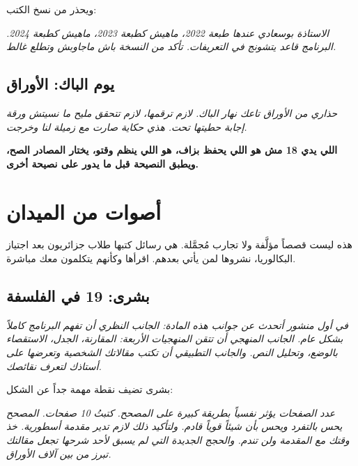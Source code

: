 \documentclass[12pt,a4paper]{book}
\newcommand{\quoteAr}[1]{%
	\begin{myquote}
		\itshape #1
	\end{myquote}
}
\newcommand{\importantAr}[1]{%
	\begin{important}
		\bfseries #1
	\end{important}
}
\begin{document}
	ويحذر من نسخ الكتب:
	
	\quoteAr{الاستاذة بوسعادي عندها طبعة 2022، ماهيش كطبعة 2023، ماهيش كطبعة 2024. البرنامج قاعد يتشونج في التعريفات. تأكد من النسخة باش ماجاوبش وتطلع غالط.}
	
	\subsection{يوم الباك: الأوراق}
	
	\quoteAr{حذاري من الأوراق تاعك نهار الباك. لازم ترقمها، لازم تتحقق مليح ما نسيتش ورقة إجابة حطيتها تحت. هذي حكاية صارت مع زميلة لنا وخرجت. }
	
	\importantAr{اللي يدي 18 مش هو اللي يحفظ بزاف، هو اللي ينظم وقتو، يختار المصادر الصح، ويطبق النصيحة قبل ما يدور على نصيحة أخرى.}
	
	

\section{أصوات من الميدان }

هذه ليست قصصاً مؤلَّفة ولا تجارب مُجمَّلة. هي رسائل كتبها طلاب جزائريون بعد اجتياز البكالوريا، نشروها لمن يأتي بعدهم. اقرأها وكأنهم يتكلمون معك مباشرة.

\subsection{بشرى: 19 في الفلسفة}

\quoteAr{في أول منشور أتحدث عن جوانب هذه المادة: الجانب النظري أن تفهم البرنامج كاملاً بشكل عام. الجانب المنهجي أن تتقن المنهجيات الأربعة: المقارنة، الجدل، الاستقصاء بالوضع، وتحليل النص. والجانب التطبيقي أن تكتب مقالاتك الشخصية وتعرضها على أستاذك لتعرف نقائصك.}

بشرى تضيف نقطة مهمة جداً عن الشكل:

\quoteAr{عدد الصفحات يؤثر نفسياً بطريقة كبيرة على المصحح. كتبتُ 10 صفحات. المصحح يحس بالتفرد ويحس بأن شيئاً قوياً قادم. ولتأكيد ذلك لازم تدير مقدمة أسطورية. خذ وقتك مع المقدمة ولن تندم. والحجج الجديدة التي لم يسبق لأحد شرحها تجعل مقالتك تبرز من بين آلاف الأوراق.}
\end{document}
